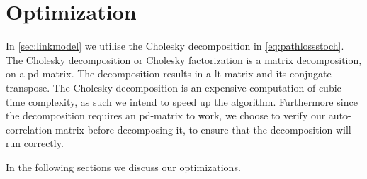 
\section{Optimization}\label{sec:optimization}


In \autoref{sec:linkmodel} we utilise the Cholesky decomposition in \autoref{eq:pathlossstoch}. The Cholesky decomposition or Cholesky factorization is a matrix decomposition, on a \gls{pd-matrix}. The decomposition results in a \gls{lt-matrix} and its \gls{conjugate-transpose}. The Cholesky decomposition is an expensive computation of cubic time complexity, as such we intend to speed up the algorithm. Furthermore since the decomposition requires an \gls{pd-matrix} to work, we choose to verify our auto-correlation matrix before decomposing it, to ensure that the decomposition will run correctly.

In the following sections we discuss our optimizations.








